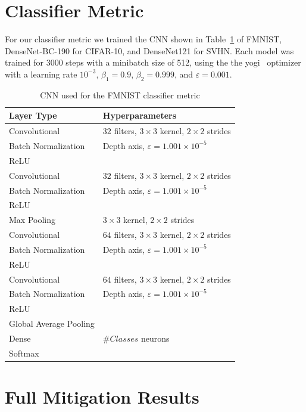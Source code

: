 \documentclass[conference,compsoc]{IEEEtran}
\begin{document}
\section{Classifier Metric}

For our classifier metric we trained the CNN shown in Table~\ref{table:cm_cnn} of FMNIST, DenseNet-BC-190 for CIFAR-10, and DenseNet121 for SVHN. Each model was trained for 3000 steps with a minibatch size of 512, using the the yogi~\cite{zaheer2018yogi} optimizer with a learning rate $10^{-3}$, $\beta_1 = 0.9$, $\beta_2 = 0.999$, and $\varepsilon = 0.001$.

\begin{table}[H]
\centering
\caption{CNN used for the FMNIST classifier metric}
\label{table:cm_cnn}
\begin{tabular}{ll}
\hline
\textbf{Layer Type} & \textbf{Hyperparameters} \\
\hline
Convolutional & $32$ filters, $3 \times 3$ kernel, $2 \times 2$ strides \\
Batch Normalization & Depth axis, $\varepsilon = 1.001 \times 10^{-5}$ \\
ReLU & \\
Convolutional & $32$ filters, $3 \times 3$ kernel, $2 \times 2$ strides \\
Batch Normalization & Depth axis, $\varepsilon = 1.001 \times 10^{-5}$ \\
ReLU & \\
Max Pooling & $3 \times 3$ kernel, $2 \times 2$ strides \\
Convolutional & $64$ filters, $3 \times 3$ kernel, $2 \times 2$ strides \\
Batch Normalization & Depth axis, $\varepsilon = 1.001 \times 10^{-5}$ \\
ReLU & \\
Convolutional & $64$ filters, $3 \times 3$ kernel, $2 \times 2$ strides \\
Batch Normalization & Depth axis, $\varepsilon = 1.001 \times 10^{-5}$ \\
ReLU & \\
Global Average Pooling & \\
Dense & $\# Classes$ neurons \\
Softmax & \\
\hline
\end{tabular}
\end{table}

\section{Full Mitigation Results}\label{sec:full_mitigation_results}
\end{document}

